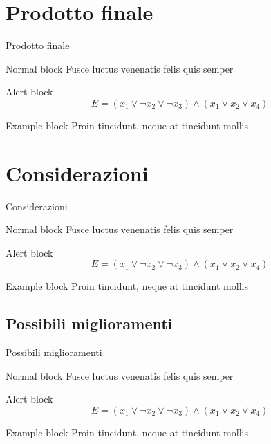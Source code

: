 \documentclass{beamer}
\begin{document}
	\section{Prodotto finale}

	\begin{frame}{Prodotto finale}
		\begin{block}{Normal block}
			Fusce luctus venenatis felis quis semper
		\end{block}

		\begin{alertblock}{Alert block}
			$$ E = (x_1 \vee \neg x_2 \vee \neg x_3) \wedge (x_1 \vee x_2 \vee x_4) $$
		\end{alertblock}

		\begin{exampleblock}{Example block}
			Proin tincidunt, neque at tincidunt mollis
		\end{exampleblock}
	\end{frame}
	
	\section{Considerazioni}

	\begin{frame}{Considerazioni}
		\begin{block}{Normal block}
			Fusce luctus venenatis felis quis semper
		\end{block}

		\begin{alertblock}{Alert block}
			$$ E = (x_1 \vee \neg x_2 \vee \neg x_3) \wedge (x_1 \vee x_2 \vee x_4) $$
		\end{alertblock}

		\begin{exampleblock}{Example block}
			Proin tincidunt, neque at tincidunt mollis
		\end{exampleblock}
	\end{frame}
	
	\subsection{Possibili miglioramenti}

	\begin{frame}{Possibili miglioramenti}
		\begin{block}{Normal block}
			Fusce luctus venenatis felis quis semper
		\end{block}

		\begin{alertblock}{Alert block}
			$$ E = (x_1 \vee \neg x_2 \vee \neg x_3) \wedge (x_1 \vee x_2 \vee x_4) $$
		\end{alertblock}

		\begin{exampleblock}{Example block}
			Proin tincidunt, neque at tincidunt mollis
		\end{exampleblock}
	\end{frame}
	
\end{document}
